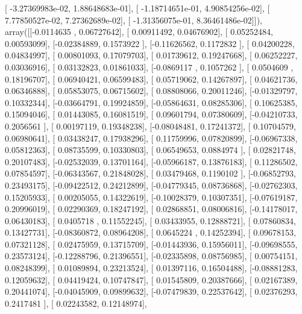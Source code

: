 \documentclass{article}
\begin{document}
       [ -3.27369983e-02,   1.88648683e-01],
       [ -1.18714651e-01,   4.90854256e-02],
       [  7.77850527e-02,   7.27362689e-02],
       [ -1.31356075e-01,   8.36461486e-02]]), array([[-0.0114635 ,  0.06727642],
       [ 0.00911492,  0.04676902],
       [ 0.05252484,  0.00593099],
       [-0.02384889,  0.1573922 ],
       [-0.11626562,  0.1172832 ],
       [ 0.04200228,  0.04834997],
       [ 0.00801093,  0.17079703],
       [ 0.01739612,  0.19247668],
       [ 0.06252227,  0.03036916],
       [ 0.03132823,  0.01861033],
       [-0.0869117 ,  0.1057262 ],
       [ 0.0504609 ,  0.18196707],
       [ 0.06940421,  0.06599483],
       [ 0.05719062,  0.14267897],
       [ 0.04621736,  0.06346888],
       [ 0.05853075,  0.06715602],
       [ 0.08808066,  0.20011246],
       [-0.01329797,  0.10332344],
       [-0.03664791,  0.19924859],
       [-0.05864631,  0.08285306],
       [ 0.10625385,  0.15094046],
       [ 0.01443085,  0.16081519],
       [ 0.09601794,  0.07380609],
       [-0.04210733,  0.2056561 ],
       [ 0.00197119,  0.19348238],
       [-0.08048481,  0.17241372],
       [ 0.10704579,  0.06980641],
       [ 0.03438247,  0.17938296],
       [ 0.11759996,  0.07820899],
       [-0.06967338,  0.05812363],
       [ 0.08735599,  0.10330803],
       [ 0.06549653,  0.0884974 ],
       [ 0.02821748,  0.20107483],
       [-0.02532039,  0.13701164],
       [-0.05966187,  0.13876183],
       [ 0.11286502,  0.07854597],
       [-0.06343567,  0.21848028],
       [ 0.03479468,  0.1190102 ],
       [-0.06852793,  0.23493175],
       [-0.09422512,  0.24212899],
       [-0.04779345,  0.08736868],
       [-0.02762303,  0.15205933],
       [ 0.00205055,  0.14322619],
       [-0.10028379,  0.10307351],
       [-0.07619187,  0.20996019],
       [ 0.02290369,  0.18247192],
       [ 0.02868851,  0.08006816],
       [-0.14178017,  0.06430183],
       [ 0.0405718 ,  0.11552245],
       [ 0.03433955,  0.12888721],
       [ 0.07860834,  0.13427731],
       [-0.08360872,  0.08964208],
       [ 0.0645224 ,  0.14252394],
       [ 0.09678153,  0.07321128],
       [ 0.02475959,  0.13715709],
       [-0.01443936,  0.15956011],
       [-0.09698555,  0.23573124],
       [-0.12288796,  0.21396551],
       [-0.02335898,  0.08756985],
       [ 0.00754151,  0.08248399],
       [ 0.01089894,  0.23213524],
       [ 0.01397116,  0.16504488],
       [-0.08881283,  0.12059632],
       [ 0.04419424,  0.10747847],
       [ 0.01545809,  0.20387666],
       [ 0.02167389,  0.20441074],
       [-0.04045909,  0.09899632],
       [-0.07479839,  0.22537642],
       [ 0.02376293,  0.2417481 ],
       [ 0.02243582,  0.12148974],
\end{document}
